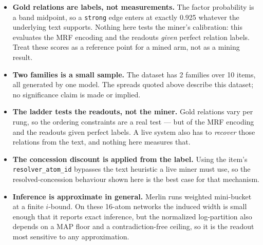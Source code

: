 \documentclass[11pt]{article}
\begin{document}
\begin{itemize}
\item \textbf{Gold relations are labels, not measurements.} The factor probability is a band midpoint, so a \texttt{strong} edge enters at exactly 0.925 whatever the underlying text supports. Nothing here tests the miner's calibration: this evaluates the MRF encoding and the readouts \emph{given} perfect relation labels. Treat these scores as a reference point for a mined arm, not as a mining result.
\item \textbf{Two families is a small sample.} The dataset has 2 families over 10 items, all generated by one model. The spreads quoted above describe this dataset; no significance claim is made or implied.
\item \textbf{The ladder tests the readouts, not the miner.} Gold relations vary per rung, so the ordering constraints are a real test --- but of the MRF encoding and the readouts given perfect labels. A live system also has to \emph{recover} those relations from the text, and nothing here measures that.
\item \textbf{The concession discount is applied from the label.} Using the item's \texttt{resolver\_atom\_id} bypasses the text heuristic a live miner must use, so the resolved-concession behaviour shown here is the best case for that mechanism.
\item \textbf{Inference is approximate in general.} Merlin runs weighted mini-bucket at a finite $i$-bound. On these 16-atom networks the induced width is small enough that it reports exact inference, but the normalized log-partition also depends on a MAP floor and a contradiction-free ceiling, so it is the readout most sensitive to any approximation.
\end{itemize}
\end{document}
